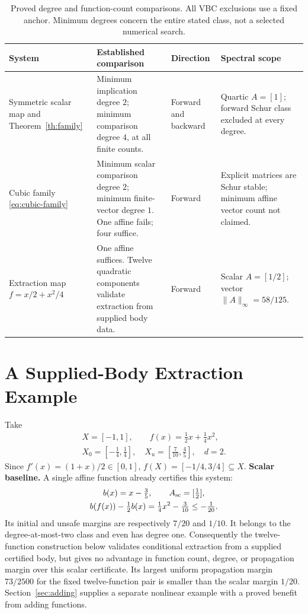 \documentclass[journal,10pt]{IEEEtran}
\theoremstyle{definition}\newtheorem{definition}{Definition}
\theoremstyle{remark}
\begin{document}
\begin{table}[t]
\centering
\caption{Proved degree and function-count comparisons. All VBC exclusions use a fixed anchor. Minimum degrees concern the entire stated class, not a selected numerical search.}\label{tab:comparisons}
\small
\begin{tabular}{@{}p{}p{}p{}p{}@{}}
\toprule
System & Established comparison & Direction & Spectral scope\\
\midrule
Symmetric scalar map and Theorem~\ref{th:family}
& Minimum implication degree $2$; minimum comparison degree $4$, at all finite counts.
& Forward and backward & Quartic $A=[1]$; forward Schur class excluded at every degree.\\
Cubic family \eqref{eq:cubic-family}
& Minimum scalar comparison degree $2$; minimum finite-vector degree $1$. One affine fails; four suffice.
& Forward & Explicit matrices are Schur stable; minimum affine vector count not claimed.\\
Extraction map $f=x/2+x^2/4$
& One affine suffices. Twelve quadratic components validate extraction from supplied body data.
& Forward & Scalar $A=[1/2]$; vector $\|A\|_\infty=58/125$.\\
\bottomrule
\end{tabular}
\end{table}
\section{A Supplied-Body Extraction Example}\label{sec:nonlinear}
Take
\[
\begin{gathered}
 X=[-1,1],\qquad f(x)=\tfrac12x+\tfrac14x^2,\\
 X_0=[-\tfrac14,\tfrac14],\quad X_u=[\tfrac7{10},\tfrac45],\quad d=2.
\end{gathered}
\]
Since $f'(x)=(1+x)/2\in[0,1]$, $f(X)=[-1/4,3/4]\subseteq X$.
\textbf{Scalar baseline.}
A single affine function already certifies this system:
\[
\begin{gathered}
 b(x)=x-\tfrac35,\qquad A_{\rm sc}=[\tfrac12],\\
 b(f(x))-\tfrac12 b(x)=\tfrac14x^2-\tfrac3{10}\leq-\tfrac1{20}.
\end{gathered}
\]
Its initial and unsafe margins are respectively $7/20$ and $1/10$.
It belongs to the degree-at-most-two class and even has degree one.
Consequently the twelve-function construction below validates conditional extraction from a supplied certified body, but gives no advantage in function count, degree, or propagation margin over this scalar certificate. Its largest uniform propagation margin $73/2500$ for the fixed twelve-function pair is smaller than the scalar margin $1/20$. Section~\ref{sec:adding} supplies a separate nonlinear example with a proved benefit from adding functions.
\end{document}
